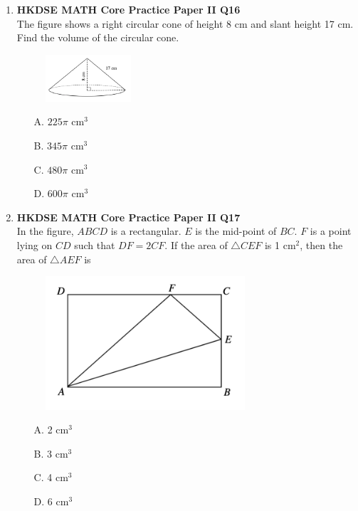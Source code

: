 \documentclass[12pt]{article}
\begin{document}
\begin{enumerate}
	\item \textbf{HKDSE MATH Core Practice Paper II Q16}\\
	The figure shows a right circular cone of height 8 cm and slant height 17 cm. Find the volume of the circular cone.
	\begin{figure}[h]
		\centering
		\includegraphics[width = 0.3\textwidth]{PPFigure2.16.png}	
	\end{figure}
	\begin{enumerate}
		\item[A.] $225\pi$ cm$^3$
		\item[B.] $345\pi$ cm$^3$
		\item[C.] $480\pi$ cm$^3$
		\item[D.] $600\pi$ cm$^3$
	\end{enumerate}

	\item \textbf{HKDSE MATH Core Practice Paper II Q17}\\
	In the figure, $ABCD$ is a rectangular. $E$ is the mid-point of $BC$. $F$ is a point lying on $CD$ such that $DF = 2CF$. If the area of $\triangle CEF$ is 1 cm$^2$, then the area of $\triangle AEF$ is 
	\begin{figure}[H]
		\centering
		\includegraphics[width = 0.7\textwidth]{PPFigure2.17.png}	
	\end{figure}
	\begin{enumerate}
		\item[A.] 2 cm$^3$
		\item[B.] 3 cm$^3$
		\item[C.] 4 cm$^3$
		\item[D.] 6 cm$^3$
	\end{enumerate}


\end{enumerate}
\end{document}
